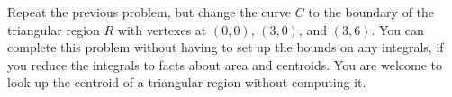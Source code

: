 \begin{problem}
Repeat the previous problem, but change the curve $C$ to the boundary of the triangular region $R$ with vertexes at $(0,0)$, $(3,0)$, and $(3,6)$.  You can complete this problem without having to set up the bounds on any integrals, if you reduce the integrals to facts about area and centroids. You are welcome to look up the centroid of a triangular region without computing it.
\end{problem}


% 
% 
% 

\clearpage


